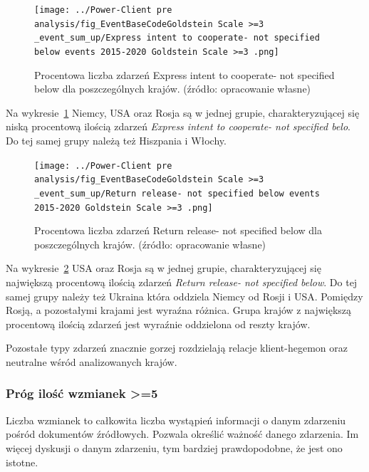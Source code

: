 \documentclass[11pt]{report}
\begin{document}
    \begin{figure}[!htp]
        \centering
        \texttt{[image: ../Power-Client pre analysis/fig\_EventBaseCodeGoldstein Scale >=3 \_event\_sum\_up/Express intent to cooperate- not specified below events 2015-2020 Goldstein Scale >=3 .png]}
        \caption{Procentowa liczba zdarzeń Express intent to cooperate- not specified below dla poszczególnych krajów. (źródło: opracowanie własne)}
        \label{fig:Power-Client:ERC:Goldstein:SumUp:Express intent to cooperate- not specified below}
    \end{figure}
    Na wykresie~\ref{fig:Power-Client:ERC:Goldstein:SumUp:Express intent to cooperate- not specified below} Niemcy, USA oraz Rosja są w jednej grupie,
    charakteryzującej się niską procentową ilością zdarzeń \textit{Express intent to cooperate- not specified belo}.
    Do tej samej grupy należą też Hiszpania i Włochy.

    \begin{figure}[!htp]
        \centering
        \texttt{[image: ../Power-Client pre analysis/fig\_EventBaseCodeGoldstein Scale >=3 \_event\_sum\_up/Return release- not specified below events 2015-2020 Goldstein Scale >=3 .png]}
        \caption{Procentowa liczba zdarzeń Return release- not specified below dla poszczególnych krajów. (źródło: opracowanie własne)}
        \label{fig:Power-Client:ERC:Goldstein:SumUp:Return release- not specified below}
    \end{figure}
    Na wykresie~\ref{fig:Power-Client:ERC:Goldstein:SumUp:Return release- not specified below} USA oraz Rosja są w jednej grupie,
    charakteryzującej się największą procentową ilością zdarzeń \textit{Return release- not specified below}.
    Do tej samej grupy należy też Ukraina która oddziela Niemcy od Rosji i USA\@.
    Pomiędzy Rosją, a pozostałymi krajami jest wyraźna różnica.
    Grupa krajów z największą procentową ilością zdarzeń jest wyraźnie oddzielona od reszty krajów.

    Pozostałe typy zdarzeń znacznie gorzej rozdzielają relacje klient-hegemon oraz neutralne wśród analizowanych krajów.

    \subsubsection{Próg ilość wzmianek >=5}
    Liczba wzmianek to całkowita liczba wystąpień informacji o danym zdarzeniu pośród dokumentów źródłowych.
    Pozwala określić ważność danego zdarzenia.
    Im więcej dyskusji o danym zdarzeniu, tym bardziej prawdopodobne, że jest ono istotne.
\end{document}
